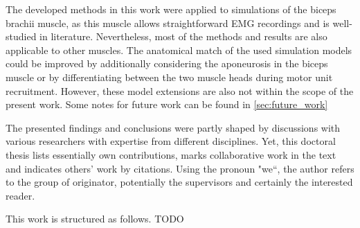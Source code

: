 The developed methods in this work were applied to simulations of the biceps brachii muscle, as this muscle allows straightforward EMG recordings and is well-studied in literature. Nevertheless, most of the methods and results are also applicable to other muscles. The anatomical match of the used simulation models could be improved by additionally considering the aponeurosis in the biceps muscle or by differentiating between the two muscle heads during motor unit recruitment. However, these model extensions are also not within the scope of the present work.
Some notes for future work can be found in \cref{sec:future_work}

The presented findings and conclusions were partly shaped by discussions with various researchers with expertise from different disciplines. Yet, this doctoral thesis lists essentially own contributions, marks collaborative work in the text and indicates others' work by citations.
Using the pronoun "we``, the author refers to the group of originator, potentially the supervisors and certainly the interested reader.

This work is structured as follows. TODO







